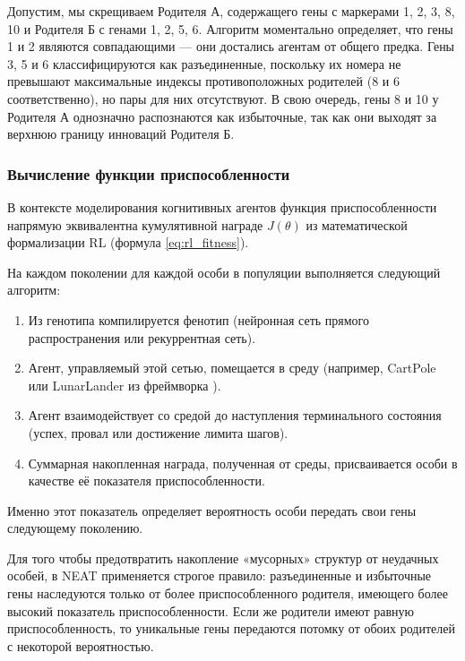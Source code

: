 Допустим, мы скрещиваем Родителя А, содержащего гены с маркерами 1, 2, 3, 8, 10 и Родителя Б с генами 1, 2, 5, 6. Алгоритм моментально определяет, что гены 1 и 2 являются совпадающими — они достались агентам от общего предка. Гены 3, 5 и 6 классифицируются как разъединенные, поскольку их номера не превышают максимальные индексы противоположных родителей (8 и 6 соответственно), но пары для них отсутствуют. В свою очередь, гены 8 и 10 у Родителя А однозначно распознаются как избыточные, так как они выходят за верхнюю границу инноваций Родителя Б.

\subsubsection{Вычисление функции приспособленности}

В контексте моделирования когнитивных агентов функция приспособленности напрямую эквивалентна кумулятивной награде $J(\theta)$ из математической формализации RL (формула \ref{eq:rl_fitness}).

На каждом поколении для каждой особи в популяции выполняется следующий алгоритм:

\begin{enumerate}

  \item Из генотипа компилируется фенотип (нейронная сеть прямого распространения или рекуррентная сеть).

  \item Агент, управляемый этой сетью, помещается в среду (например, CartPole или LunarLander из фреймворка \cite{towers2025gymnasiumstandardinterfacereinforcement}).
  
  \item Агент взаимодействует со средой до наступления терминального состояния (успех, провал или достижение лимита шагов).
  
  \item Суммарная накопленная награда, полученная от среды, присваивается особи в качестве её показателя приспособленности.
  
\end{enumerate}

Именно этот показатель определяет вероятность особи передать свои гены следующему поколению.

Для того чтобы предотвратить накопление «мусорных» структур от неудачных особей, в NEAT применяется строгое правило: разъединенные и избыточные гены наследуются только от более приспособленного родителя, имеющего более высокий показатель приспособленности. Если же родители имеют равную приспособленность, то уникальные гены передаются потомку от обоих родителей с некоторой вероятностью.

